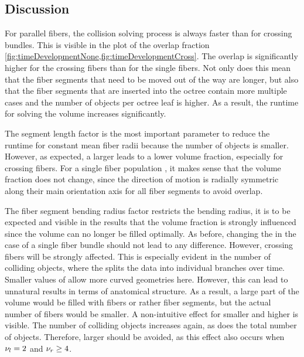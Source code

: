 \subsection{Discussion}
%
For parallel fibers, the collision solving process is always faster than for crossing bundles.
This is visible in the plot of the overlap fraction \cref{fig:timeDevelopmentNone,fig:timeDevelopmentCross}.
The overlap is significantly higher for the crossing fibers than for the single fibers.
Not only does this mean that the fiber segments that need to be moved out of the way are longer, but also that the fiber segments that are inserted into the octree contain more multiple cases and the number of objects per octree leaf is higher.
As a result, the runtime for solving the volume increases significantly.
\par
%
The segment length factor \segLengthFactor{} is the most important parameter to reduce the runtime for constant mean fiber radii \fiberRadiusMean{} because the number of objects is smaller.
However, as expected, a larger \segLengthFactor{} leads to a lower volume fraction, especially for crossing fibers.
For a single fiber population \pfbs{}, it makes sense that the volume fraction does not change, since the direction of motion is radially symmetric along their main orientation axis for all fiber segments to avoid overlap.
\par
%
The fiber segment bending radius factor \segRadiusFactor{} restricts the bending radius, it is to be expected and visible in the results that the volume fraction is strongly influenced since the volume can no longer be filled optimally.
As before, changing the \segRadiusFactor{} in the case of a single fiber bundle should not lead to any difference.
However, crossing fibers will be strongly affected.
This is especially evident in the number of colliding objects, where the \segRadiusFactor{} splits the data into individual branches over time.
Smaller values of \segRadiusFactor{} allow more curved geometries here.
However, this can lead to unnatural results in terms of anatomical structure.
As a result, a large part of the volume would be filled with fibers or rather fiber segments, but the actual number of fibers would be smaller.
A non-intuitive effect for smaller \segLengthFactor{} and higher \segRadiusFactor{} is visible.
The number of colliding objects increases again, as does the total number of objects.
Therefore, larger \segRadiusFactor{} should be avoided, as this effect also occurs when $\textnormal{$\nu_{l}$} = 2$ and $\textnormal{$\nu_{r}$} \geq 4$.
